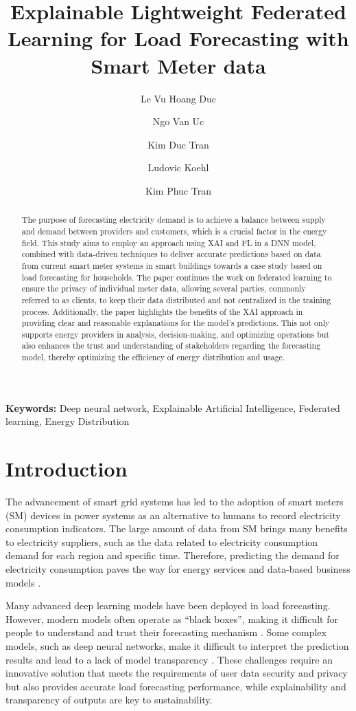 \documentclass[11pt,a4paper]{article}
\title{Explainable Lightweight Federated Learning for Load Forecasting with Smart Meter data}
\author[1]{Le Vu Hoang Duc}
\author[1]{Ngo Van Uc}
\author[2,1]{Kim Duc Tran}
\author[2]{Ludovic Koehl}
\author[2]{Kim Phuc Tran}
\affil[1]{International Chair in DS \& XAI, International
Research Institute for Artificial Intelligence and Data Science, Dong A University, Danang, Vietnam}
\affil[2]{Univ. Lille, ENSAIT, ULR 2461 - GEMTEX - G\'enie et Mat\'eriaux Textiles, F-59000 Lille, France}
\begin{document}
\maketitle

\begin{abstract}
The purpose of forecasting electricity demand is to achieve a balance between supply and demand between providers and customers, which is a crucial factor in the energy field. This study aims to employ an approach using XAI and FL in a DNN model, combined with data-driven techniques to deliver accurate predictions based on data from current smart meter systems in smart buildings towards a case study based on load forecasting for households. The paper continues the work on federated learning to ensure the privacy of individual meter data, allowing several parties, commonly referred to as clients, to keep their data distributed and not centralized in the training process. Additionally, the paper highlights the benefits of the XAI approach in providing clear and reasonable explanations for the model's predictions. This not only supports energy providers in analysis, decision-making, and optimizing operations but also enhances the trust and understanding of stakeholders regarding the forecasting model, thereby optimizing the efficiency of energy distribution and usage.
\end{abstract}

\noindent\textbf{Keywords:}  Deep neural network, Explainable Artificial Intelligence,  Federated learning, Energy Distribution

\section{Introduction}

The advancement of smart grid systems has led to the adoption of smart meters (SM) devices in power systems as an alternative to humans to record electricity consumption indicators. The large amount of data from SM brings many benefits to electricity suppliers, such as the data related to electricity consumption demand for each region and specific time. Therefore, predicting the demand for electricity consumption paves the way for energy services and data-based business models \cite{athanasiadis2024review}.

Many advanced deep learning models have been deployed in load forecasting. However, modern models often operate as “black boxes”, making it difficult for people to understand and trust their forecasting mechanism \cite{yaprakdal2023multivariate}. Some complex models, such as deep neural networks, make it difficult to interpret the prediction results and lead to a lack of model transparency \cite{jang2023raid}. These challenges require an innovative solution that meets the requirements of user data security and privacy but also provides accurate load forecasting performance, while explainability and transparency of outputs are key to sustainability.
\end{document}
